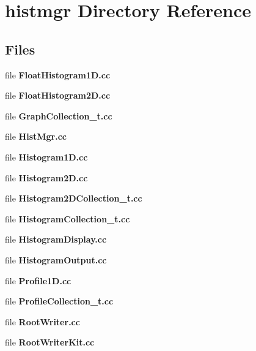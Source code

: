 \section{histmgr Directory Reference}
\label{dir_c1a81d9c54aa4fd0d36933aaf0266ebb}
\subsection*{Files}
\begin{DoxyCompactItemize}
\item 
file {\bfseries Float\-Histogram1\-D.\-cc}
\item 
file {\bfseries Float\-Histogram2\-D.\-cc}
\item 
file {\bfseries Graph\-Collection\-\_\-t.\-cc}
\item 
file {\bfseries Hist\-Mgr.\-cc}
\item 
file {\bfseries Histogram1\-D.\-cc}
\item 
file {\bfseries Histogram2\-D.\-cc}
\item 
file {\bfseries Histogram2\-D\-Collection\-\_\-t.\-cc}
\item 
file {\bfseries Histogram\-Collection\-\_\-t.\-cc}
\item 
file {\bfseries Histogram\-Display.\-cc}
\item 
file {\bfseries Histogram\-Output.\-cc}
\item 
file {\bfseries Profile1\-D.\-cc}
\item 
file {\bfseries Profile\-Collection\-\_\-t.\-cc}
\item 
file {\bfseries Root\-Writer.\-cc}
\item 
file {\bfseries Root\-Writer\-Kit.\-cc}
\end{DoxyCompactItemize}
